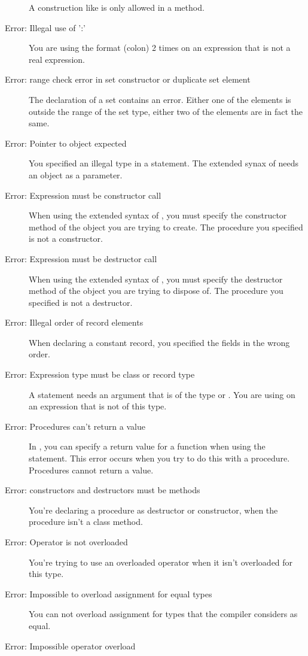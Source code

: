 \begin{description}
 A construction like  is only allowed in a method.
\item [Error: Illegal use of ':']
 You are using the format \var{:} (colon) 2 times on an expression that
 is not a real expression.
\item [Error: range check error in set constructor or duplicate set element]
 The declaration of a set contains an error. Either one of the elements is
 outside the range of the set type, either two of the elements are in fact
 the same.
\item [Error: Pointer to object expected]
 You specified an illegal type in a  statement.
 The extended synax of  needs an  object as a parameter.
\item [Error: Expression must be constructor call]
 When using the extended syntax of , you must specify the constructor
 method of the object you are trying to create. The procedure you specified
 is not a constructor.
\item [Error: Expression must be destructor call]
 When using the extended syntax of , you must specify the
 destructor method of the object you are trying to dispose of.
 The procedure you specified is not a destructor.
\item [Error: Illegal order of record elements]
 When declaring a constant record, you specified the fields in the wrong
 order.
\item [Error: Expression type must be class or record type]
 A  statement needs an argument that is of the type 
 or . You are using  on an expression that is not of
 this type.
\item [Error: Procedures can't return a value]
 In \fpc, you can specify a return value for a function when using
 the  statement. This error occurs when you try to do this with a
 procedure. Procedures  cannot return a value.
\item [Error: constructors and destructors must be methods]
 You're declaring a procedure as destructor or constructor, when the
 procedure isn't a class method.
\item [Error: Operator is not overloaded]
 You're trying to use an overloaded operator when it isn't overloaded for
 this type.
\item [Error: Impossible to overload assignment for equal types]
 You can not overload assignment for types
 that the compiler considers as equal.
\item [Error: Impossible operator overload]

\end{description}
